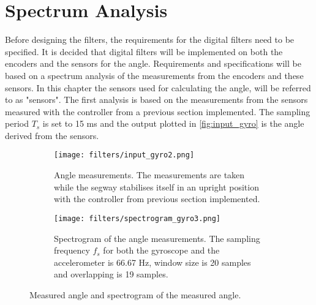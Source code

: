 \section{Spectrum Analysis}
Before designing the filters, the requirements for the digital filters need to be specified. It is decided that digital filters will be implemented on both the encoders and the sensors for the angle. Requirements and specifications will be based on a spectrum analysis of the measurements from the encoders and these sensors. In this chapter the sensors used for calculating the angle, will be referred to as "sensors". The first analysis is based on the measurements from the sensors measured with the controller from a previous section implemented. The sampling period $T_s$ is set to 15 ms and the output plotted in \autoref{fig:input_gyro} is the angle derived from the sensors.


\begin{figure}[H]
\centering
\begin{subfigure}[b]{0.95\textwidth}
\hspace*{-0.6cm} 
    \texttt{[image: filters/input\_gyro2.png]}
    \caption{Angle measurements. The measurements are taken while the segway stabilises itself in an upright position with the controller from previous section implemented.}
    \label{fig:input_gyro}
\end{subfigure}    
\begin{subfigure}[b]{0.98\textwidth}
    \texttt{[image: filters/spectrogram\_gyro3.png]}
    \caption{Spectrogram of the angle measurements. The sampling frequency $f_s$ for both the gyroscope and the accelerometer is 66.67 Hz, window size is 20 samples and overlapping is 19 samples.}
    \label{fig:spectrogram_gyro}
\end{subfigure}   
\caption{Measured angle and spectrogram of the measured angle.}
\end{figure}

